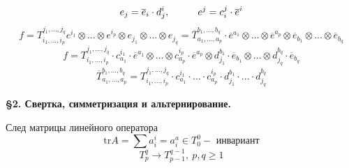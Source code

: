 \documentclass[a4paper, 12pt]{article}
\newcommand\tab[1][.5cm]{\hspace*{#1}}
\theoremstyle{definition}
\begin{document}
    $$e_j = \overline{e}_i\cdot d_j^i,\tab[1cm] e^j = c_i^j\cdot \overline{e}^i$$ 
    $$f = T_{i_1,...,i_p}^{j_1,...,j_q}e^{i_1}\otimes ... \otimes e^{i_p} \otimes e_{j_1} \otimes ... \otimes e_{j_q} = \overline{T}_{a_1,...,a_p}^{b_1,...,b_q} \cdot\overline{e}^{a_1}\otimes ... \otimes \overline{e}^{a_p}\otimes \overline{e}_{b_1}\otimes ... \otimes \overline{e}_{b_q}$$
    $$f = T_{i_1,...,i_p}^{j_1,...,j_q}\cdot c_{a_1}^{i_1}\cdot \overline{e}^{a_1} \otimes ... \otimes c_{a_p}^{i_p}\cdot \overline{e}^{a_p} \otimes d_{j_1}^{b_1}\cdot \overline{e}_{b_1} \otimes ... \otimes d_{j_q}^{b_q}\cdot \overline{e}_{b_q}$$
    $$\boxed{\overline{T}_{a_1,...,a_p}^{b_1,...,b_q} = T_{i_1,...,i_p}^{j_1,...,j_q}\cdot c_{a_1}^{i_1}\cdot ... \cdot c_{a_p}^{i_p} \cdot d_{j_1}^{b_1}\cdot ... \cdot d_{j_q}^{b_q}}$$
    \begin{center}
        \begin{Large}
            \textbf{\S2. Свертка, симметризация и альтернирование.}
        \end{Large}
    \end{center}
    След матрицы линейного оператора 
    $$\text{tr}A = \sum a_i^i = a_i^a \in T_0^0 - \text{ инвариант}$$
    $$T_p^q \to T_{p-1}^{q-1},\ p,q \geq 1$$










    
\end{document}
